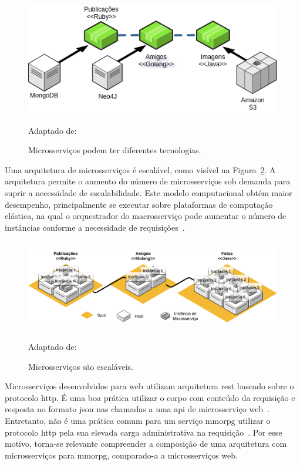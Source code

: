 \begin{figure}[htb!]
\caption{Microsserviços podem ter diferentes tecnologias.}
\label{fig:microsservicos_tecnologias}
\includegraphics[height=5cm]{img/cap2/microsservicos_tecnologias.png}
\centering

Adaptado de:~\cite{Newman2015Feb}
\end{figure}


Uma arquitetura de microsserviços é escalável, como visível na Figura~\ref{fig:microsservicos_escalabilidade}.
%
A arquitetura permite o aumento do número de microsserviços sob demanda para suprir a necessidade de escalabilidade.
%
Este modelo computacional obtém maior desempenho, principalmente se executar sobre plataformas de computação elástica, na qual o orquestrador do macrosserviço pode aumentar o número de instâncias conforme a necessidade de requisições~\cite{Nadareishvili2016Aug}.



\begin{figure}[htb!]
\caption{Microsserviços são escaláveis.}
\label{fig:microsservicos_escalabilidade}
\includegraphics[height=4cm]{img/cap2/microsservicos_escalabilidade.png}
\centering

Adaptado de:~\cite{Newman2015Feb}
\end{figure}



Microsserviços desenvolvidos para web utilizam arquitetura \ac{rest} baseado sobre o protocolo \ac{http}.
%
É uma boa prática utilizar o corpo com conteúdo da requisição e resposta no formato \ac{json} nas chamadas a uma \ac{api} de microsserviço web~\cite{Nadareishvili2016Aug}.
%
Entretanto, não é uma prática comum para um serviço \ac{mmorpg} utilizar o protocolo \ac{http} pela sua elevada carga administrativa na requisição~\cite{1417630}.
%
Por esse motivo, torna-se relevante compreender a composição de uma arquitetura com microsserviços para \ac{mmorpg}, comparado-a a microsserviços web.




